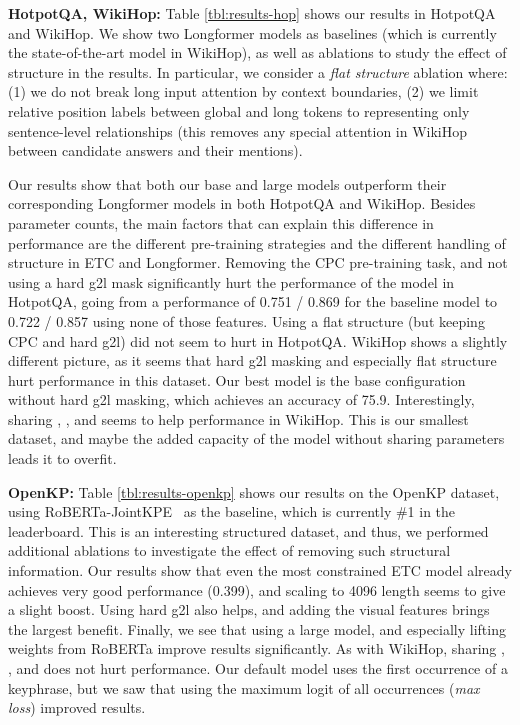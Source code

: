 \documentclass[11pt,a4paper]{article}
\begin{document}
{\bf HotpotQA, WikiHop:} Table \ref{tbl:results-hop} shows our results in HotpotQA and WikiHop. We show two Longformer models as baselines (which is currently the state-of-the-art model in WikiHop), as well as ablations to study the effect of structure in the results. In particular, we consider a {\em flat structure} ablation where: (1) we do not break long input attention by context boundaries, (2) we limit relative position labels between global and long tokens to representing only sentence-level relationships (this removes any special attention in WikiHop between candidate answers and their mentions).

Our results show that both our base and large models outperform their corresponding Longformer models in both HotpotQA and WikiHop. Besides parameter counts, the main factors that can explain this difference in performance are the different pre-training strategies and the different handling of structure in ETC and Longformer.
Removing the CPC pre-training task, and not using a hard g2l mask significantly hurt the performance of the model in HotpotQA, going from a performance of 0.751 / 0.869 for the baseline model to 0.722 / 0.857 using none of those features. Using a flat structure (but keeping CPC and hard g2l) did not seem to hurt in HotpotQA.
WikiHop shows a slightly different picture, as it seems that hard g2l masking and especially flat structure hurt performance in this dataset. Our best model is the base configuration without hard g2l masking, which achieves an accuracy of 75.9. Interestingly, sharing , , and  seems to help performance in WikiHop. This is our smallest dataset, and maybe the added capacity of the model without sharing parameters leads it to overfit.

{\bf OpenKP:} Table \ref{tbl:results-openkp} shows our results on the OpenKP dataset, using RoBERTa-JointKPE~\cite{sun2020joint} as the baseline, which is currently \#1 in the leaderboard. This is an interesting structured dataset, and thus, we performed additional ablations to investigate the effect of removing such structural information. Our results show that even the most constrained ETC model already achieves very good performance (0.399), and scaling to 4096 length seems to give a slight boost. Using hard g2l also helps, and adding the visual features brings the largest benefit. Finally, we see that using a large model, and especially lifting weights from RoBERTa improve results significantly. As with WikiHop, sharing , , and  does not hurt performance. Our default model uses the first occurrence of a keyphrase, but we saw that using the maximum logit of all occurrences ({\em max loss}) improved results.
\end{document}
